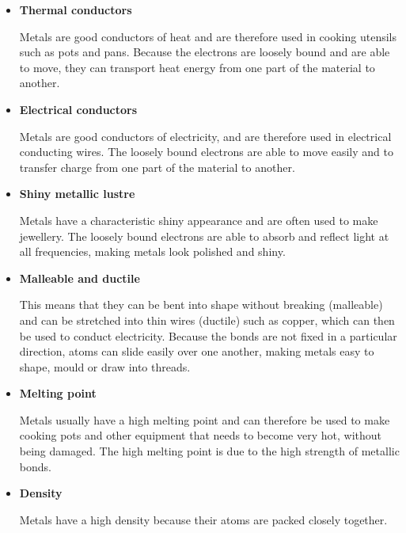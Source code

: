 \begin{itemize}
\item{\textbf{Thermal conductors}

Metals are good conductors of heat and are therefore used in cooking utensils such as pots and pans. Because the electrons are loosely bound and are able to move, they can transport heat energy from one part of the material to another.}

\item{\textbf{Electrical conductors}

Metals are good conductors of electricity, and are therefore used in electrical conducting wires. The loosely bound electrons are able to move easily and to transfer charge from one part of the material to another.}

\item{\textbf{Shiny metallic lustre}

Metals have a characteristic shiny appearance and are often used to make jewellery. The loosely bound electrons are able to absorb and reflect light at all frequencies, making metals look polished and shiny.}

\item{\textbf{Malleable and ductile}

This means that they can be bent into shape without breaking (malleable) and can be stretched into thin wires (ductile) such as copper, which can then be used to conduct electricity. Because the bonds are not fixed in a particular direction, atoms can slide easily over one another, making metals easy to shape, mould or draw into threads.}

\item{\textbf{Melting point}

Metals usually have a high melting point and can therefore be used to make cooking pots and other equipment that needs to become very hot, without being damaged. The high melting point is due to the high strength of metallic bonds.}

\item{\textbf{Density}

Metals have a high density because their atoms are packed closely together.}

\end{itemize}

